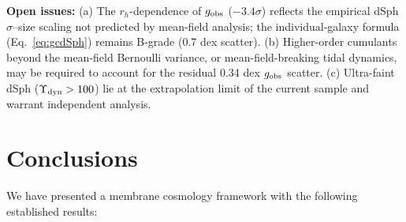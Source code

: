 \documentclass[11pt,a4paper]{article}
\newcommand{\gobs}{g_{\rm obs}}
\newcommand{\Ydyn}{\Upsilon_{\rm dyn}}
\newcommand{\rh}{r_{h}}
\begin{document}
\textbf{Open issues:} (a) The $\rh$-dependence of $\gobs$ ($-3.4\sigma$) reflects the empirical dSph
$\sigma$--size scaling not predicted by mean-field analysis; the individual-galaxy formula
(Eq.~\ref{eq:gcdSph}) remains B-grade (0.7 dex scatter). (b) Higher-order cumulants beyond the mean-field
Bernoulli variance, or mean-field-breaking tidal dynamics, may be required to account for the residual 0.34
dex $\gobs$ scatter. (c) Ultra-faint dSph ($\Ydyn > 100$) lie at the extrapolation limit of the current
sample and warrant independent analysis.

\section{Conclusions}

We have presented a membrane cosmology framework with the following established results:
\end{document}
